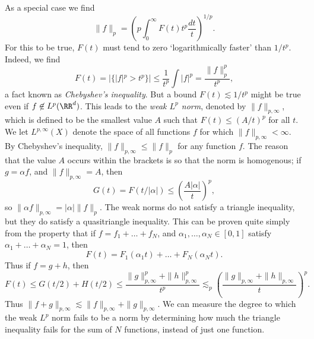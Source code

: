 As a special case we find
%
\[ \| f \|_p = \left( p \int_0^\infty F(t) t^p \frac{dt}{t} \right)^{1/p}. \]
%
For this to be true, $F(t)$ must tend to zero `logarithmically faster' than $1/t^p$. Indeed, we find
%
\[ F(t) = |\{ |f|^p > t^p \}| \leq \frac{1}{t^p} \int |f|^p = \frac{\| f \|_p^p}{t^p}, \]
%
a fact known as \emph{Chebyshev's inequality}. But a bound $F(t) \lesssim 1/t^p$ might be true even if $f \not \in L^p(\RR^d)$. This leads to the \emph{weak $L^p$ norm}, denoted by $\| f \|_{p,\infty}$, which is defined to be the smallest value $A$ such that $F(t) \leq (A/t)^p$ for all $t$. We let $L^{p,\infty}(X)$ denote the space of all functions $f$ for which $\| f \|_{p,\infty} < \infty$. By Chebyshev's inequality, $\| f \|_{p,\infty} \leq \| f \|_p$ for any function $f$. The reason that the value $A$ occurs within the brackets is so that the norm is homogenous; if $g = \alpha f$, and $\| f \|_{p,\infty} = A$, then
%
\[ G(t) = F(t/|\alpha|) \leq \left( \frac{A |\alpha|}{t} \right)^p, \]
%
so $\| \alpha f \|_{p,\infty} = |\alpha| \| f \|_p$. The weak norms do not satisfy a triangle inequality, but they do satisfy a quasitriangle inequality. This can be proven quite simply from the property that if $f = f_1 + \dots + f_N$, and $\alpha_1, \dots, \alpha_N \in [0,1]$ satisfy $\alpha_1 + \dots + \alpha_N = 1$, then
%
\[ F(t) = F_1(\alpha_1 t) + \dots + F_N(\alpha_N t). \]
%
Thus if $f = g + h$, then
%
\[ F(t) \leq G(t/2) + H(t/2) \leq \frac{\| g \|_{p,\infty}^p + \| h \|_{p,\infty}^p}{t^p} \lesssim_p \left( \frac{\| g \|_{p,\infty} + \| h \|_{p,\infty}}{t} \right)^p. \]
%
Thus $\| f + g \|_{p,\infty} \lesssim \| f \|_{p,\infty} + \| g \|_{p,\infty}$. We can measure the degree to which the weak $L^p$ norm fails to be a norm by determining how much the triangle inequality fails for the sum of $N$ functions, instead of just one function.

